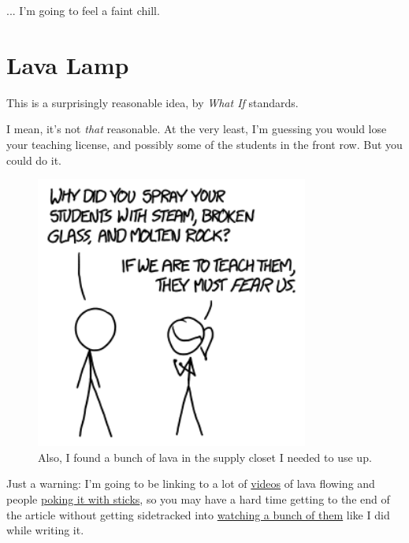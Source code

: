 {{... I'm going to feel a faint chill.}

{
\chapter{Lava Lamp}
}

\hfill{}

{This is a surprisingly reasonable idea, by \emph{What If} standards.}

{I mean, it's not \emph{that} reasonable. At the very least, I'm guessing you would lose your teaching license, and possibly some of the students in the front row. But you could do it.}

\begin{figure}[!htbp]
\centering
\includegraphics[scale=0.5, max width=0.8\textwidth]{imgs/a/122/fear.png}
\caption{Also, I found a bunch of lava in the supply closet I needed to use up.}
\end{figure}

{Just a warning: I'm going to be linking to a lot of \href{https://www.youtube.com/watch?v=K2x7FGzjbqQ}{videos} of lava flowing and people \href{https://www.youtube.com/watch?v=SbcM7lh6DSQ}{poking it with sticks}, so you may have a hard time getting to the end of the article without getting sidetracked into \href{https://www.youtube.com/watch?v=6M-YX-r0Ll4}{watching a bunch of them} like I did while writing it.}

}
